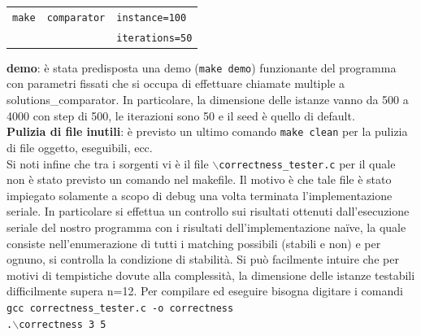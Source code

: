 \documentclass[12pt]{article}
\begin{document}
    \begin{table}[h]
    \begin{tabular}{lll}
        \texttt{make} & \texttt{comparator} & \texttt{instance=100} \\ 
        & & \texttt{iterations=50} \\
        \end{tabular}
    \end{table}
    
    \textbf{demo}: è stata predisposta una demo (\texttt{make demo}) funzionante del programma con parametri fissati che si occupa di effettuare chiamate multiple a solutions\_comparator. In particolare, la dimensione delle istanze vanno da 500 a 4000 con step di 500, le iterazioni sono 50 e il seed è quello di default. \\

    \textbf{Pulizia di file inutili}: è previsto un ultimo comando \texttt{make clean} per la pulizia di file oggetto, eseguibili, ecc. \\

    Si noti infine che tra i sorgenti vi è il file \texttt{$\backslash$correctness\_tester.c} per il quale non è stato previsto un comando nel makefile. Il motivo è che tale file è stato impiegato solamente a scopo di debug una volta terminata l'implementazione seriale. In particolare si effettua un controllo sui risultati ottenuti dall'esecuzione seriale del nostro programma con i risultati dell'implementazione na\"ive, la quale consiste nell'enumerazione di tutti i matching possibili (stabili e non) e per ognuno, si controlla la condizione di stabilità. Si può facilmente intuire che per motivi di tempistiche dovute alla complessità, la dimensione delle istanze testabili difficilmente supera n=12. Per compilare ed eseguire bisogna digitare i comandi \\

    \texttt{gcc correctness\_tester.c -o correctness}\\

    \texttt{.$\backslash$correctness 3 5}
\pagebreak

\printbibliography
\end{document}
